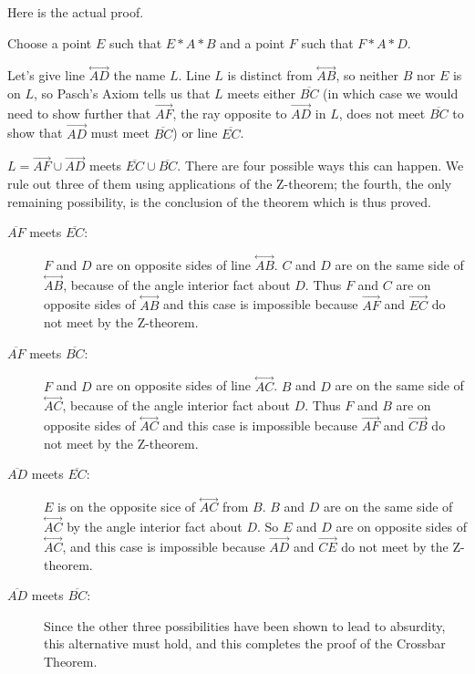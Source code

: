 \documentclass[12pt]{article}
\newcommand\Line[1]{\overset{\leftrightarrow}{#1}}
\begin{document}
\begin{description}
Here is the actual proof.

Choose a point $E$ such that $E*A*B$ and a point $F$ such that $F*A*D$.

Let's give line $\Line{AD}$ the name $L$.  Line $L$ is distinct from $\Line{AB}$, so neither $B$ nor $E$ is on $L$, so Pasch's Axiom tells us that $L$ meets either $\overline{BC}$ (in which case we would need to show further that $\overrightarrow{AF}$, the ray opposite to $\overrightarrow{AD}$ in $L$, does not meet $\overline{BC}$ to show that $\overrightarrow{AD}$ must meet $\overline{BC}$) or line $\overline{EC}$.

$L = \overrightarrow{AF} \cup \overrightarrow{AD}$ meets $\overline{EC} \cup \overline{BC}$.  There are four possible ways this can happen.  We rule out three of them using applications of the Z-theorem;  the fourth, the only remaining possibility, is the conclusion of the theorem which is thus proved.

\begin{description}

\item[$\overline{AF}$ meets $\overline{EC}$:]  $F$ and $D$ are on opposite sides of line $\Line{AB}$.  $C$ and $D$ are on the same side of $\Line{AB}$, because of the angle interior fact about $D$.  Thus $F$ and $C$ are on opposite sides of $\Line{AB}$ and this case is impossible because $\overrightarrow{AF}$ and $\overrightarrow{EC}$ do not meet by the Z-theorem.

\item[$\overline{AF}$ meets $\overline{BC}$:]  $F$ and $D$ are on opposite sides of line $\Line{AC}$.  $B$ and $D$ are on the same side of $\Line{AC}$, because of the angle interior fact about $D$.  Thus $F$ and $B$ are on opposite sides of $\Line{AC}$ and this case is impossible because $\overrightarrow{AF}$ and $\overrightarrow{CB}$ do not meet by the Z-theorem.

\item[$\overline{AD}$ meets $\overline{EC}$:]  $E$ is on the opposite sice of $\Line{AC}$ from $B$.  $B$ and $D$ are on the same side of $\Line{AC}$ by the angle interior fact about $D$.  So $E$ and $D$ are on opposite sides of $\Line{AC}$, and this case is impossible because $\overrightarrow{AD}$ and $\overrightarrow{CE}$ do not meet by the Z-theorem.

\item[$\overline{AD}$ meets $\overline{BC}$:]  Since the other three possibilities have been shown to lead to absurdity, this alternative must hold, and this completes the proof of the Crossbar Theorem.
\end{description}

\end{description}
\end{document}
